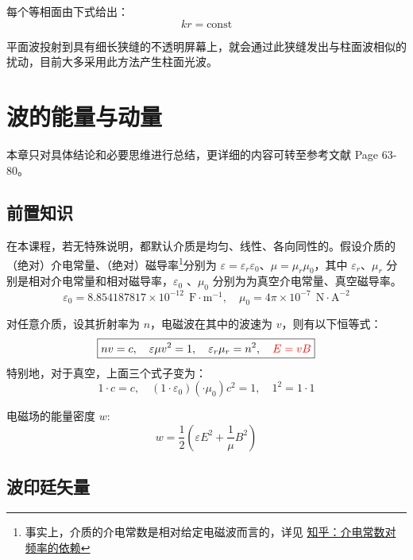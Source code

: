 \documentclass[UTF8]{report}
\theoremstyle{MyLineTheoremStyle} %
\theoremstyle{MyBlockTheoremStyle} %
\theoremstyle{MySubsubsectionStyle} %
\begin{document}
每个等相面由下式给出：
\begin{equation}
    kr = \text{const}
\end{equation}

平面波投射到具有细长狭缝的不透明屏幕上，就会通过此狭缝发出与柱面波相似的扰动，目前大多采用此方法产生柱面光波。

\section{波的能量与动量}

本章只对具体结论和必要思维进行总结，更详细的内容可转至参考文献 \cite{Optics} Page 63-80。

\subsection{前置知识}

在本课程，若无特殊说明，都默认介质是均匀、线性、各向同性的。假设介质的（绝对）介电常量、（绝对）磁导率\footnote{事实上，介质的介电常数是相对给定电磁波而言的，详见 \href{https://zhuanlan.zhihu.com/p/62494685}{知乎：介电常数对频率的依赖}}分别为 $\varepsilon = \varepsilon_r \varepsilon_0$、$\mu = \mu_r \mu_0$，其中 $\varepsilon_r$、$\mu_r$ 分别是相对介电常量和相对磁导率，$\varepsilon_0 $ 、$\mu_0$ 分别为为真空介电常量、真空磁导率。
\begin{equation}
    \varepsilon_0 = 8.854187817 \times 10^{-12}\ \ \mathrm{F\cdot m^{-1}},\quad \mu_0 = 4 \pi \times 10^{-7} \ \ \mathrm{N\cdot A^{-2}} 
\end{equation}

对任意介质，设其折射率为 $n$，电磁波在其中的波速为 $v$，则有以下恒等式：
\begin{gather}
\boxed{
    nv = c ,\quad \varepsilon \mu v^2= 1,\quad \varepsilon_r \mu_r = n^2 ,\quad {\color{red} E = vB}
}
\end{gather}
特别地，对于真空，上面三个式子变为：
\begin{equation}
1 \cdot c = c ,\quad (1\cdot \varepsilon_0) (\cdot \mu_0) c^2  = 1,\quad 1^2 = 1\cdot 1
\end{equation}

电磁场的能量密度 $w$: 
\begin{equation}
w = \frac{1}{2}\left( \varepsilon E^2 + \frac{1}{\mu} B^2 \right)
\end{equation}

\subsection{波印廷矢量}
\end{document}
